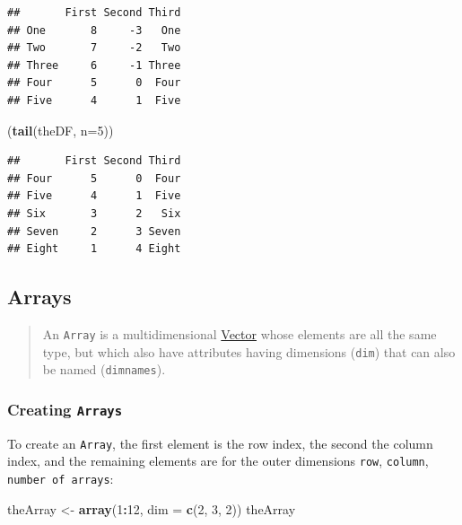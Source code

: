 \documentclass[]{book}
\newenvironment{Shaded}{\begin{snugshade}}{\end{snugshade}}
\newcommand{\DataTypeTok}[1]{\textcolor[rgb]{0.13,0.29,0.53}{#1}}
\newcommand{\DecValTok}[1]{\textcolor[rgb]{0.00,0.00,0.81}{#1}}
\newcommand{\KeywordTok}[1]{\textcolor[rgb]{0.13,0.29,0.53}{\textbf{#1}}}
\newcommand{\NormalTok}[1]{#1}
\newcommand{\OperatorTok}[1]{\textcolor[rgb]{0.81,0.36,0.00}{\textbf{#1}}}
\newcommand{\StringTok}[1]{\textcolor[rgb]{0.31,0.60,0.02}{#1}}
\theoremstyle{definition}
\theoremstyle{definition}
\theoremstyle{definition}
\theoremstyle{remark}
\begin{document}
\begin{verbatim}
##       First Second Third
## One       8     -3   One
## Two       7     -2   Two
## Three     6     -1 Three
## Four      5      0  Four
## Five      4      1  Five
\end{verbatim}

\begin{Shaded}
\begin{Highlighting}[]
\NormalTok{(}\KeywordTok{tail}\NormalTok{(theDF, }\DataTypeTok{n=}\DecValTok{5}\NormalTok{))}
\end{Highlighting}
\end{Shaded}

\begin{verbatim}
##       First Second Third
## Four      5      0  Four
## Five      4      1  Five
## Six       3      2   Six
## Seven     2      3 Seven
## Eight     1      4 Eight
\end{verbatim}

\hypertarget{arrays}{%
\subsection{Arrays}\label{arrays}}

\begin{quote}
An \texttt{Array} is a multidimensional
\protect\hyperlink{vectors}{Vector} whose elements are all the same
type, but which also have attributes having dimensions (\texttt{dim})
that can also be named (\texttt{dimnames}).
\end{quote}

\hypertarget{creating-arrays}{%
\subsubsection{\texorpdfstring{Creating
\texttt{Arrays}}{Creating Arrays}}\label{creating-arrays}}

To create an \texttt{Array}, the first element is the row index, the
second the column index, and the remaining elements are for the outer
dimensions \texttt{row}, \texttt{column}, \texttt{number\ of\ arrays}:

\begin{Shaded}
\begin{Highlighting}[]
\NormalTok{theArray <-}\StringTok{ }\KeywordTok{array}\NormalTok{(}\DecValTok{1}\OperatorTok{:}\DecValTok{12}\NormalTok{, }\DataTypeTok{dim =} \KeywordTok{c}\NormalTok{(}\DecValTok{2}\NormalTok{, }\DecValTok{3}\NormalTok{, }\DecValTok{2}\NormalTok{))}
\NormalTok{theArray}
\end{Highlighting}
\end{Shaded}
\end{document}
